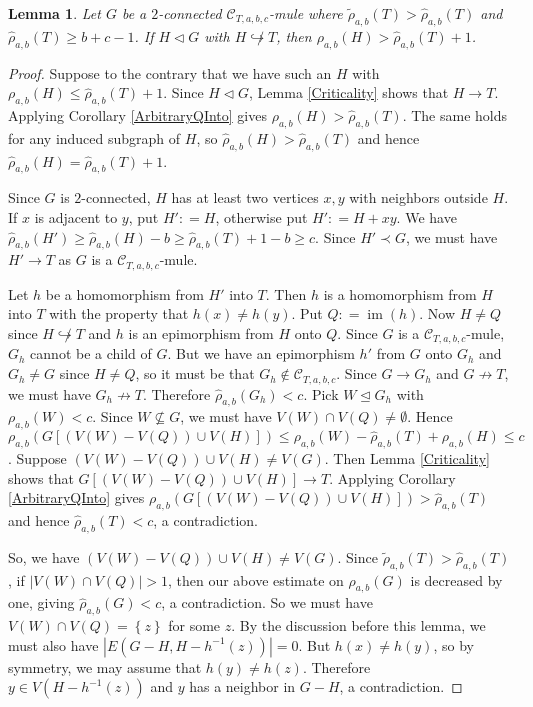\documentclass[12pt]{amsart}
\theoremstyle{plain}
\newtheorem{lem}[thm]{Lemma}
\theoremstyle{definition}
\theoremstyle{remark}
\newcommand{\fancy}[1]{\mathcal{#1}}
\newcommand{\C}{\fancy{C}}
\newcommand{\inj}{\hookrightarrow}
\newcommand{\set}[1]{\left\{ #1 \right\}}
\newcommand{\card}[1]{\left|#1\right|}
\newcommand{\parens}[1]{\left( #1 \right)}
\newcommand{\brackets}[1]{\left[ #1 \right]}
\newcommand{\DefinedAs}{\mathrel{\mathop:}=}
\newcommand{\im}{\operatorname{im}}
\begin{document}
\begin{lem}\label{UsingT}
Let $G$ be a $2$-connected $\C_{T,a,b,c}$-mule where $\tilde{\rho}_{a,b}(T) > \hat{\rho}_{a,b}(T)$ and $\hat{\rho}_{a,b}(T) \ge b + c - 1$.  If $H \lhd G$ with $H \not \inj T$, then $\rho_{a,b}(H) > \hat{\rho}_{a,b}(T) + 1$.
\end{lem}
\begin{proof}
Suppose to the contrary that we have such an $H$ with $\rho_{a,b}(H) \le \hat{\rho}_{a,b}(T) + 1$. Since $H \lhd G$, Lemma \ref{Criticality} shows that $H \rightarrow T$. Applying Corollary \ref{ArbitraryQInto} gives $\rho_{a,b}(H) > \hat{\rho}_{a,b}(T)$.  The same holds for any induced subgraph of $H$, so $\hat{\rho}_{a,b}(H) > \hat{\rho}_{a,b}(T)$ and hence $\hat{\rho}_{a,b}(H) = \hat{\rho}_{a,b}(T) + 1$.  

Since $G$ is $2$-connected, $H$ has at least two vertices $x, y$ with neighbors outside $H$.  If $x$ is adjacent to $y$, put $H' \DefinedAs H$, otherwise put $H' \DefinedAs H + xy$.  We have $\hat{\rho}_{a,b}(H') \ge \hat{\rho}_{a,b}(H) - b \ge \hat{\rho}_{a,b}(T) + 1 - b \ge c$.   Since $H' \prec G$, we must have $H' \rightarrow T$ as $G$ is a $\C_{T,a,b,c}$-mule.

Let $h$ be a homomorphism from $H'$ into $T$.  Then $h$ is a homomorphism from $H$ into $T$ with the property that $h(x) \ne h(y)$. Put $Q \DefinedAs \im(h)$. Now $H \ne Q$ since $H \not \inj T$ and $h$ is an epimorphism from $H$ onto $Q$. Since $G$ is a $\C_{T,a,b,c}$-mule, $G_h$ cannot be a child of $G$.  But we have an epimorphism $h'$ from $G$ onto $G_h$ and $G_h \ne G$ since $H \ne Q$, so it must be that $G_h \not \in \C_{T,a,b,c}$.  Since $G \rightarrow G_h$ and $G \not \rightarrow T$, we must have $G_h \not \rightarrow T$.  Therefore $\hat{\rho}_{a,b}(G_h) < c$.  Pick $W \unlhd G_h$ with $\rho_{a,b}(W) < c$.  Since $W \not \subseteq G$, we must have $V(W) \cap V(Q) \ne \emptyset$.  Hence $\rho_{a,b}\parens{G\brackets{(V(W) - V(Q)) \cup V(H)}} \le \rho_{a,b}(W) - \hat{\rho}_{a,b}(T) + \rho_{a,b}(H) \le c$.  Suppose $(V(W) - V(Q)) \cup V(H) \ne V(G)$.  Then Lemma \ref{Criticality} shows that $G\brackets{(V(W) - V(Q)) \cup V(H)} \rightarrow T$.  Applying Corollary \ref{ArbitraryQInto} gives $\rho_{a,b}\parens{G\brackets{(V(W) - V(Q)) \cup V(H)}} > \hat{\rho}_{a,b}(T)$ and hence $\hat{\rho}_{a,b}(T) < c$, a contradiction.  

So, we have $(V(W) - V(Q)) \cup V(H) \ne V(G)$.  Since $\tilde{\rho}_{a,b}(T) > \hat{\rho}_{a,b}(T)$, if $\card{V(W) \cap V(Q)} > 1$, then our above estimate on $\rho_{a,b}(G)$ is decreased by one, giving $\hat{\rho}_{a,b}(G) < c$, a contradiction.  So we must have $V(W) \cap V(Q) = \set{z}$ for some $z$.  By the discussion before this lemma, we must also have $\card{E(G - H , H - h^{-1}(z))} = 0$.  But $h(x) \ne h(y)$, so by symmetry, we may assume that $h(y) \ne h(z)$.  Therefore $y \in V(H - h^{-1}(z))$ and $y$ has a neighbor in $G-H$, a contradiction.
\end{proof}
\end{document}
